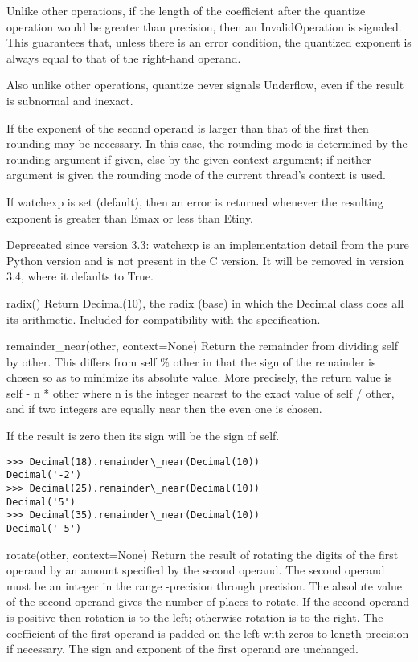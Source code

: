 Unlike other operations, if the length of the coefficient after the quantize operation would be greater than precision, then an InvalidOperation is signaled. This guarantees that, unless there is an error condition, the quantized exponent is always equal to that of the right-hand operand.

Also unlike other operations, quantize never signals Underflow, even if the result is subnormal and inexact.

If the exponent of the second operand is larger than that of the first then rounding may be necessary. In this case, the rounding mode is determined by the rounding argument if given, else by the given context argument; if neither argument is given the rounding mode of the current thread’s context is used.

If watchexp is set (default), then an error is returned whenever the resulting exponent is greater than Emax or less than Etiny.


Deprecated since version 3.3: watchexp is an implementation detail from the pure Python version and is not present in the C version. It will be removed in version 3.4, where it defaults to True.

radix()
Return Decimal(10), the radix (base) in which the Decimal class does all its arithmetic. Included for compatibility with the specification.

remainder\_near(other, context=None)
Return the remainder from dividing self by other. This differs from self \% other in that the sign of the remainder is chosen so as to minimize its absolute value. More precisely, the return value is self - n * other where n is the integer nearest to the exact value of self / other, and if two integers are equally near then the even one is chosen.

If the result is zero then its sign will be the sign of self.

\begin{lstlisting}
>>> Decimal(18).remainder\_near(Decimal(10))
Decimal('-2')
>>> Decimal(25).remainder\_near(Decimal(10))
Decimal('5')
>>> Decimal(35).remainder\_near(Decimal(10))
Decimal('-5')
\end{lstlisting}

rotate(other, context=None)
Return the result of rotating the digits of the first operand by an amount specified by the second operand. The second operand must be an integer in the range -precision through precision. The absolute value of the second operand gives the number of places to rotate. If the second operand is positive then rotation is to the left; otherwise rotation is to the right. The coefficient of the first operand is padded on the left with zeros to length precision if necessary. The sign and exponent of the first operand are unchanged.

